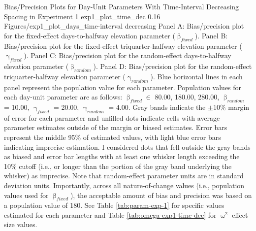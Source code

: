 \documentclass[
12pt, %
twoside,
english]{guelphthesis}
\begin{document}
\begin{apaFigure}
[portrait]
[samepage]
[-0.2cm] %
{Bias/Precision Plots for Day-Unit Parameters With Time-Interval Decreasing Spacing in Experiment 1} 
{exp1_plot_time_dec}
{0.16} %
{Figures/exp1_plot_days_time-interval decreasing} %
{Panel A: Bias/precision plot for the fixed-effect days-to-halfway elevation parameter ($\upbeta_{fixed}$). Panel B: Bias/precision plot for the fixed-effect triquarter-halfway elevation parameter ($\upgamma_{fixed}$). Panel C: Bias/precision plot for the random-effect days-to-halfway elevation parameter ($\upbeta_{random}$). Panel D: Bias/precision plot for the random-effect triquarter-halfway elevation parameter ($\upgamma_{random}$). Blue horizontal lines in each panel represent the population value for each parameter. Population values for each day-unit parameter are as follows: $\upbeta_{fixed} \in$ {80.00, 180.00, 280.00}, $\upbeta_{random}$ = 10.00, $\upgamma_{fixed}$ = 20.00, $\upgamma_{random}$ = 4.00. Gray bands indicate the $\pm 10\%$ margin of error for each parameter and unfilled dots indicate cells with average parameter estimates outside of the margin or biased estimates. Error bars represent the middle 95\% of estimated values, with light blue error bars indicating imprecise estimation. I considered dots that fell outside the gray bands as biased and error bar lengths with at least one whisker length exceeding the 10\% cutoff (i.e., or longer than the portion of the gray band underlying the whisker) as imprecise. Note that random-effect parameter units are in standard deviation units. Importantly, across all nature-of-change values (i.e., population values used for $\upbeta_{fixed}$), the acceptable amount of bias and precision was based on a population value of 180. See Table \ref{tab:param-exp-1} for specific values estimated for each parameter and Table \ref{tab:omega-exp1-time-dec} for $\upomega^2$ effect size values.}
\end{apaFigure}
\end{document}
